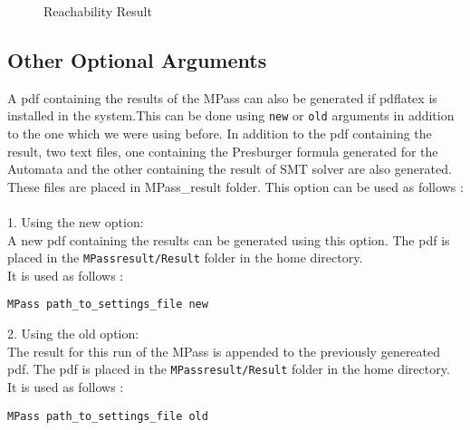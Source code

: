 \begin{figure}[H]
  \begin{center}
  \end{center}
\caption{Reachability Result}\label{fig:result}
\end{figure}
\pagebreak

\subsection{Other Optional Arguments}
\def\verbatim@font{\normalfont\ttfamily}

A pdf containing the results of the MPass can also be generated if pdflatex is 
installed in the system.This can be done using {\tt new} or {\tt old} arguments in addition to the one which we were using before. In addition to the pdf containing
the result, two text files, one containing the Presburger formula generated for the Automata and the other containing the result of SMT solver are also generated. 
These files are placed in MPass\_result folder. This option can be used as follows :\\\\
1. Using the new option:\\
A new pdf containing the results can be generated using this option. The pdf is placed
in the {\tt MPass\textunderscore result/Result} folder in the home directory.\\
It is used as follows :
\begin{Verbatim}
MPass path_to_settings_file new
\end{Verbatim}
2. Using the old option:\\
The result for this run of the MPass is appended to the previously genereated pdf. 
The pdf is placed in the {\tt MPass\textunderscore result/Result} folder in the home directory.\\
It is used as follows :
\begin{Verbatim}
MPass path_to_settings_file old
\end{Verbatim}




